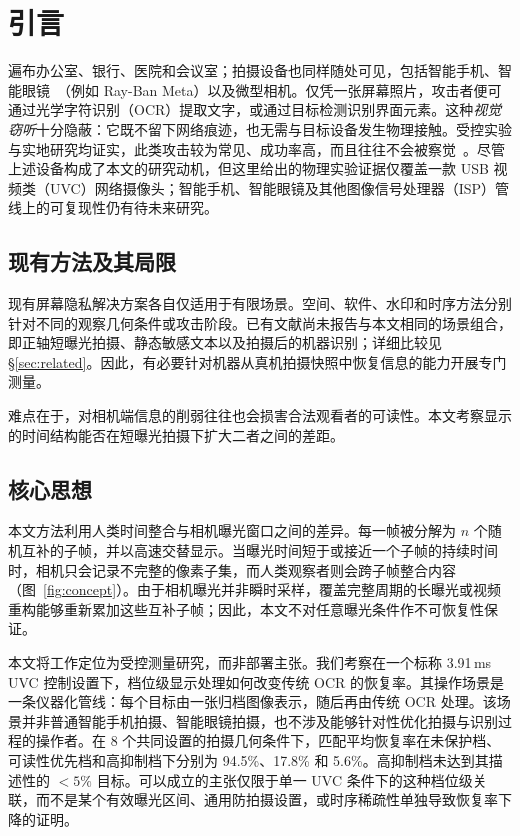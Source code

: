 \documentclass{ieeeaccess}
\begin{document}
\section{引言}

遍布办公室、银行、医院和会议室；拍摄设备也同样随处可见，包括智能手机、智能眼镜~\cite{b_wang2026}（例如 Ray-Ban Meta）以及微型相机。仅凭一张屏幕照片，攻击者便可通过光学字符识别（OCR）提取文字，或通过目标检测识别界面元素。这种\emph{视觉窃听}十分隐蔽：它既不留下网络痕迹，也无需与目标设备发生物理接触。受控实验与实地研究均证实，此类攻击较为常见、成功率高，而且往往不会被察觉~\cite{b_ponemon2016,b_eiband2017}。尽管上述设备构成了本文的研究动机，但这里给出的物理实验证据仅覆盖一款 USB 视频类（UVC）网络摄像头；智能手机、智能眼镜及其他图像信号处理器（ISP）管线上的可复现性仍有待未来研究。

\subsection{现有方法及其局限}

现有屏幕隐私解决方案各自仅适用于有限场景。空间、软件、水印和时序方法分别针对不同的观察几何条件或攻击阶段。已有文献尚未报告与本文相同的场景组合，即正轴短曝光拍摄、静态敏感文本以及拍摄后的机器识别；详细比较见 \S\ref{sec:related}。因此，有必要针对机器从真机拍摄快照中恢复信息的能力开展专门测量。

难点在于，对相机端信息的削弱往往也会损害合法观看者的可读性。本文考察显示的时间结构能否在短曝光拍摄下扩大二者之间的差距。

\subsection{核心思想}

本文方法利用人类时间整合与相机曝光窗口之间的差异。每一帧被分解为 $n$ 个随机互补的子帧，并以高速交替显示。当曝光时间短于或接近一个子帧的持续时间时，相机只会记录不完整的像素子集，而人类观察者则会跨子帧整合内容（图~\ref{fig:concept}）。由于相机曝光并非瞬时采样，覆盖完整周期的长曝光或视频重构能够重新累加这些互补子帧；因此，本文不对任意曝光条件作不可恢复性保证。

本文将工作定位为受控测量研究，而非部署主张。我们考察在一个标称 3.91\,ms UVC 控制设置下，档位级显示处理如何改变传统 OCR 的恢复率。其操作场景是一条仪器化管线：每个目标由一张归档图像表示，随后再由传统 OCR 处理。该场景并非普通智能手机拍摄、智能眼镜拍摄，也不涉及能够针对性优化拍摄与识别过程的操作者。在 8 个共同设置的拍摄几何条件下，匹配平均恢复率在未保护档、可读性优先档和高抑制档下分别为 94.5\%、17.8\% 和 5.6\%。高抑制档未达到其描述性的 $<5\%$ 目标。可以成立的主张仅限于单一 UVC 条件下的这种档位级关联，而不是某个有效曝光区间、通用防拍摄设置，或时序稀疏性单独导致恢复率下降的证明。
\end{document}
